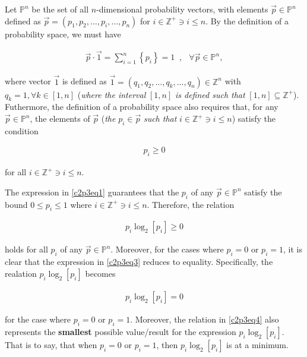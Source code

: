 \documentclass[ClusteringConnectionsMAIN.tex]{subfiles}
\begin{document}
	
  Let $\mathbb{P}^n$ be the set of all $n$-dimensional probability vectors, with elements $\vec{p} \in \mathbb{P}^n$ defined as $\vec{p} = \left( p_1, p_2, \dots, p_i, \dots, p_n \right)$ for $i \in \mathbb{Z}^+ \ni i \leq n$.  By the definition of a probability space, we must have

\begin{align} \label{c2p3eq1}
\vec{p} \cdot \vec{1} = \sum_{i = 1}^n \left\{ p_i \right\} = 1  \; \; , \; \; \, \forall \vec{p} \in \mathbb{P}^n, \tag{2.3-1}
\end{align}

where vector $\vec{1}$ is defined as $\vec{1} = \left( q_1, q_2, \dots, q_k, \dots, q_n \right) \in \mathbb{Z}^n$ with $q_k = 1, \forall k \in \left[ 1, n \right]$ (\emph{where the interval} $\left[ 1, n \right]$ \emph{is defined such that} $\left[ 1, n \right] \subseteq \mathbb{Z}^+$). Futhermore, the definition of a probability space also requires that, for any $\vec{p} \in \mathbb{P}^n$, the elements of $\vec{p}$ (\emph{the} $p_i \in \vec{p}$ \emph{such that} $i \in \mathbb{Z}^+ \ni i \leq n$) satisfy the condition

\begin{align} \label{c2p3eq2}
p_i \geq 0  \tag{2.3-2} 
\end{align}

for all $i \in \mathbb{Z}^+ \ni i \leq n$. \newline


The expression in \ref{c2p3eq1} guarantees that the $p_i$ of any $\vec{p} \in \mathbb{P}^n$ satisfy the bound $0 \leq p_i \leq 1$ where $i \in \mathbb{Z}^+ \ni i \leq n$.  Therefore, the relation

\begin{align} \label{c2p3eq3}
p_i \log_2 \left[ p_i \right] \geq 0  \tag{2.3-3}
\end{align}

holds for all $p_i$ of any $\vec{p} \in \mathbb{P}^n$.  Moreover, for the cases where $p_i = 0$ or $p_i = 1$, it is clear that the expression in \ref{c2p3eq3} reduces to equality.  Specifically, the realation $p_i \log_2 \left[ p_i \right]$ becomes

\begin{align*} \label{c2p3eq4}
p_i \log_2 \left[ p_i \right] = 0  \tag{2.3-4}
\end{align*}

for the case where $p_i = 0$ or $p_i = 1$.  Moreover, the relation in \ref{c2p3eq4} also represents the \textbf{smallest} possible value/result for the expression $p_i \log_2 \left[ p_i \right]$.  That is to say, that when $p_i = 0$ or $p_i = 1$, then $p_i \log_2 \left[ p_i \right]$ is at a minimum.  \newline
\end{document}
